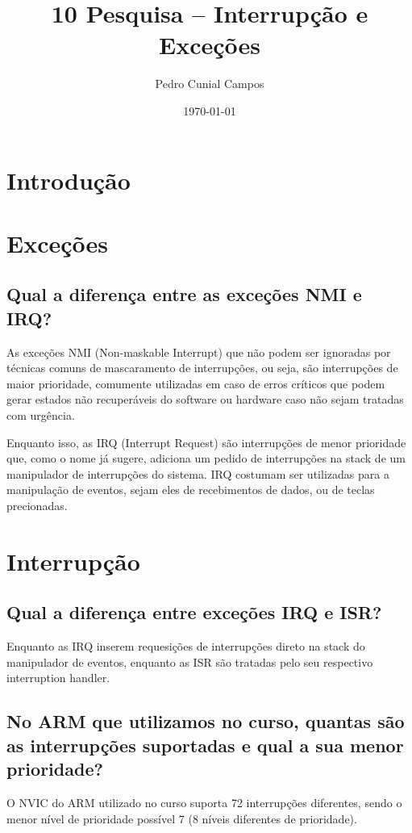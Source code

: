 \documentclass[11pt]{article}
\author{Pedro Cunial Campos}
\date{\today}
\title{10 Pesquisa -- Interrupção e Exceções}
\begin{document}
\maketitle
\tableofcontents



\section{Introdução}
\label{sec:orgheadline1}
\section{Exceções}
\label{sec:orgheadline3}
\subsection{Qual a diferença entre as exceções NMI e IRQ?}
\label{sec:orgheadline2}
As exceções NMI (Non-maskable Interrupt) que não podem ser ignoradas
por técnicas comuns de mascaramento de interrupções, ou seja, são interrupções
de maior prioridade, comumente utilizadas em caso de erros críticos que podem
gerar estados não recuperáveis do software ou hardware caso não sejam tratadas
com urgência.

Enquanto isso, as IRQ (Interrupt Request) são interrupções de menor prioridade
que, como o nome já sugere, adiciona um pedido de interrupções na stack de um
manipulador de interrupções do sistema. IRQ costumam ser utilizadas para a
manipulação de eventos, sejam eles de recebimentos de dados, ou de teclas
precionadas.

\section{Interrupção}
\label{sec:orgheadline11}
\subsection{Qual a diferença entre exceções IRQ e ISR?}
\label{sec:orgheadline4}
Enquanto as IRQ inserem requesições de interrupções direto na stack do
manipulador de eventos, enquanto as ISR são tratadas pelo seu respectivo
interruption handler.
\subsection{No ARM que utilizamos no curso, quantas são as interrupções suportadas e qual a sua menor prioridade?}
\label{sec:orgheadline5}
O NVIC do ARM utilizado no curso suporta 72 interrupções diferentes, sendo o
menor nível de prioridade possível 7 (8 níveis diferentes de prioridade).
\end{document}
